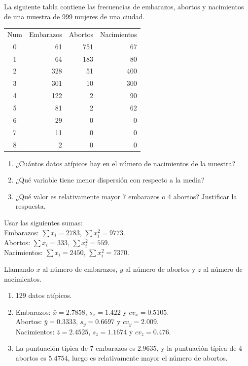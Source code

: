 {La siguiente tabla contiene las frecuencias de embarazos, abortos y nacimientos de una muestra de 999 mujeres de una ciudad.

\begin{center}
\begin{tabular}{crrr}
\toprule
Num & Embarazos & Abortos & Nacimientos\\
0 & 61 & 751 & 67 \\
1 & 64 & 183 & 80 \\
2 & 328 & 51 & 400 \\
3 & 301 & 10 & 300 \\
4 & 122 & 2 & 90 \\
5 & 81 & 2 & 62 \\
6 & 29 & 0 & 0 \\
7 & 11 & 0 & 0 \\
8 & 2 & 0 & 0 \\
\bottomrule
\end{tabular}
\end{center}

\begin{enumerate}
\item ¿Cuántos datos atípicos hay en el número de nacimientos de la muestra?
\item ¿Qué variable tiene menor dispersión con respecto a la media?
\item ¿Qué valor es relativamente mayor 7 embarazos o 4 abortos? Justificar la respuesta.
\end{enumerate}

Usar las siguientes sumas:\\
Embarazos: $\sum x_i= 2783$, $\sum x_i^2=9773$.\\
Abortos: $\sum x_i= 333$, $\sum x_i^2=559$.\\
Nacimientos: $\sum x_i= 2450$, $\sum x_i^2=7370$.
}
{
Llamando $x$ al número de embarazos, $y$ al número de abortos y $z$ al número de nacimientos.
\begin{enumerate}
\item 129 datos atípicos. 
\item Embarazos: $\bar{x}=2.7858$, $s_x=1.422$ y  $cv_x=0.5105$.\\ 
Abortos: $\bar{𝑦}=0.3333$, $s_y=0.6697$ y $cv_y=2.009$.\\ 
Nacimientos: $\bar{z}=2.4525$, $s_z=1.1674$ y $cv_z=0.476$. 
\item La puntuación típica de 7 embarazos es $2.9635$, y la puntuación típica de 4 abortos es $5.4754$, luego es relativamente mayor el número de abortos. 
\end{enumerate}
}
{
}
